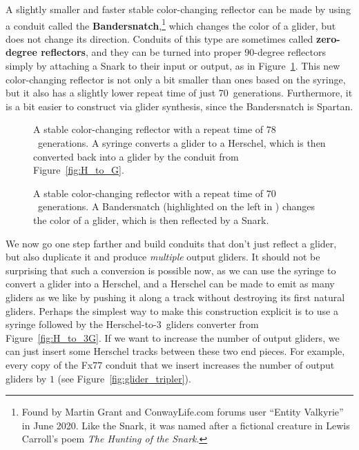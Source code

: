 A slightly smaller and faster stable color-changing reflector can be made by using a conduit called the \textbf{Bandersnatch},\footnote{Found by Martin Grant and ConwayLife.com forums user ``Entity Valkyrie'' in June 2020. Like the Snark, it was named after a fictional creature in Lewis Carroll's poem \emph{The Hunting of the Snark}.} which changes the color of a glider, but does not change its direction. Conduits of this type are sometimes called \textbf{zero-degree reflectors}, and they can be turned into proper 90-degree reflectors simply by attaching a Snark to their input or output, as in Figure~\ref{fig:bandersnatch}. This new color-changing reflector is not only a bit smaller than ones based on the syringe, but it also has a slightly lower repeat time of just 70~generations. Furthermore, it is a bit easier to construct via glider synthesis, since the Bandersnatch is Spartan.

\begin{figure}[!htb]
	\centering
	\begin{minipage}{.56\textwidth}
		\centering
		\caption{A stable color-changing reflector with a repeat time of $78$~generations. A syringe converts a glider to a Herschel, which is then converted back into a glider by the conduit from Figure~\ref{fig:H_to_G}.}\label{fig:color_change_stable}
	\end{minipage} \hfill %
	\begin{minipage}{.405\textwidth}
		\centering
		\caption{A stable color-changing reflector with a repeat time of $70$~generations. A Bandersnatch (highlighted on the left in ) changes the color of a glider, which is then reflected by a Snark.}\label{fig:bandersnatch}
	\end{minipage}
\end{figure}

We now go one step farther and build conduits that don't just reflect a glider, but also duplicate it and produce \emph{multiple} output gliders. It should not be surprising that such a conversion is possible now, as we can use the syringe to convert a glider into a Herschel, and a Herschel can be made to emit as many gliders as we like by pushing it along a track without destroying its first natural gliders. Perhaps the simplest way to make this construction explicit is to use a syringe followed by the Herschel-to-$3$~gliders converter from Figure~\ref{fig:H_to_3G}. If we want to increase the number of output gliders, we can just insert some Herschel tracks between these two end pieces. For example, every copy of the Fx77 conduit that we insert increases the number of output gliders by $1$ (see Figure~\ref{fig:glider_tripler}).

